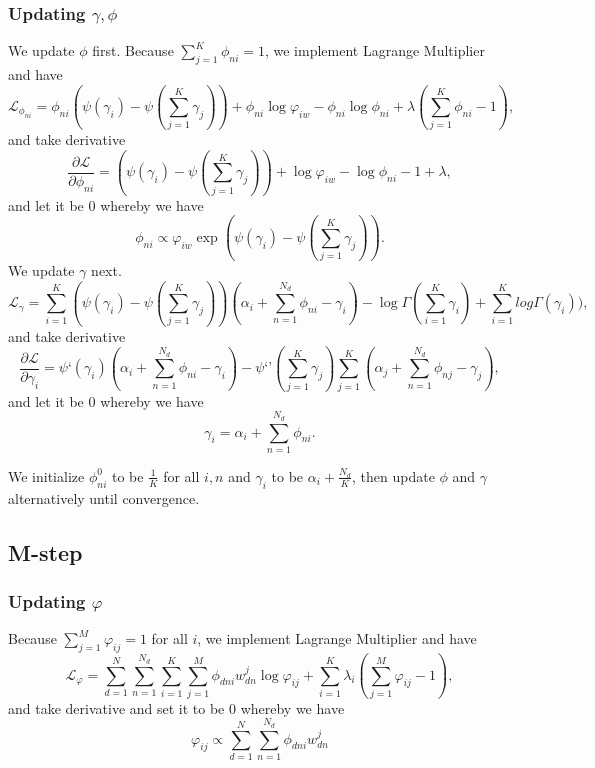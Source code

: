 \documentclass{article}
\begin{document}
\subsubsection{Updating $  \gamma, \phi $}
We update $ \phi $ first. Because $ \sum^{K}_{j=1}\phi_{ni} = 1 $, we implement Lagrange Multiplier and have
\begin{equation*}
	\mathcal{L}_{\phi_{ni}} = \phi_{ni}(\psi(\gamma_i) - \psi(\sum^{K}_{j=1}\gamma_j)) + \phi_{ni}\log\varphi_{iw} - \phi_{ni}\log\phi_{ni} + \lambda(\sum^{K}_{j=1}\phi_{ni}-1),
\end{equation*}
and take derivative
\begin{equation*}
	\frac{\partial{\mathcal{L}}}{\partial{\phi_{ni}}} = (\psi(\gamma_i)-\psi(\sum^{K}_{j=1}\gamma_j)) + \log\varphi_{iw} -\log\phi_{ni} - 1 + \lambda,
\end{equation*}
and let it be 0 whereby we have
\begin{equation*}
	\phi_{ni} \propto \varphi_{iw}\exp(\psi(\gamma_i) - \psi(\sum^{K}_{j=1}\gamma_j)).
\end{equation*}
We update $ \gamma $ next.
\begin{equation*}
	\mathcal{L}_{\gamma} = \sum^{K}_{i=1}(\psi(\gamma_i) - \psi(\sum^{K}_{j=1}\gamma_j))(\alpha_i + \sum^{N_d}_{n=1}\phi_{ni} - \gamma_{i}) - \log\Gamma(\sum^{K}_{i=1}\gamma_i) + \sum^{K}_{i=1}log\Gamma(\gamma_i)),
\end{equation*}
and take derivative
\begin{equation*}
	\frac{\partial{\mathcal{L}}}{\partial{\gamma_{i}}} = \psi{‘}(\gamma_i)(\alpha_i + \sum^{N_d}_{n=1}\phi_{ni} - \gamma_i) - \psi{‘’}(\sum^{K}_{j=1}\gamma_{j}) \sum^{K}_{j=1}(\alpha_j + \sum^{N_d}_{n=1}\phi_{nj} - \gamma_j),
\end{equation*}
and let it be 0 whereby we have
\begin{equation*}
	\gamma_i = \alpha_i + \sum^{N_d}_{n=1}\phi_{ni}.
\end{equation*}

We initialize $ \phi_{ni}^{0} $ to be $ \frac{1}{K} $ for all $ i, n $ and $ \gamma_i $ to be $ \alpha_i + \frac{N_d}{K} $, then update $ \phi $ and $ \gamma $ alternatively until convergence.

\subsection{M-step}

\subsubsection{Updating $ \varphi $}
Because $ \sum^{M}_{j=1}\varphi_{ij} = 1  $ for all $ i $, we implement Lagrange Multiplier and have
\begin{equation*}
	\mathcal{L}_{\varphi} = \sum^{N}_{d=1}\sum^{N_d}_{n=1}\sum^{K}_{i=1}\sum^{M}_{j=1} \phi_{dni}w^{j}_{dn}\log\varphi_{ij} + \sum^{K}_{i=1}\lambda_{i}(\sum^{M}_{j=1}\varphi_{ij} - 1),
\end{equation*}
and take derivative and set it to be 0 whereby we have
\begin{equation*}
	\varphi_{ij} \propto \sum^{N}_{d=1}\sum^{N_d}_{n=1}\phi_{dni}w^{j}_{dn}
\end{equation*}
\end{document}

